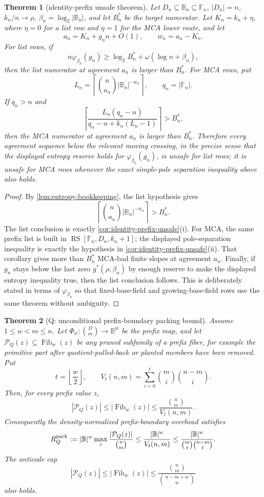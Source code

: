 \documentclass[a4paper,11pt]{amsart}
\newtheorem{theorem}{Theorem}[section]
\theoremstyle{remark}
\newcommand{\F}{\mathbb F}
\newcommand{\B}{\mathbb B}
\newcommand{\RS}{\operatorname{RS}}
\newcommand{\Fib}{\operatorname{Fib}}
\begin{document}
\begin{theorem}[identity-prefix unsafe theorem]\label{thm:unsafe-envelope}
Let \(D_n\subseteq\B_n\subseteq\F_n\), \(|D_n|=n\), \(k_n/n\to\rho\), \(\beta_n=\log_2|\B_n|\), and let \(B_n^*\) be the target numerator.  Let \(K_n=k_n+\eta\), where \(\eta=0\) for a list row and \(\eta=1\) for the MCA lower route, and let
\[
        a_n=K_n+g_nn+O(1),
        \qquad
        w_n=a_n-K_n .
\]
For list rows, if
\[
        n\varphi_{\beta_n}(g_n)
        \ge
        \log_2 B_n^*+\omega(\log n+\beta_n),
\]
then the list numerator at agreement \(a_n\) is larger than \(B_n^*\).  For MCA rows, put
\[
        L_n=\left\lceil \binom n{a_n}|\B_n|^{-w_n}\right\rceil,
        \qquad q_n=|\F_n| .
\]
If \(q_n>n\) and
\[
        \left\lceil \frac{L_n(q_n-n)}{q_n-n+k_n(L_n-1)}\right\rceil>B_n^*,
\]
then the MCA numerator at agreement \(a_n\) is larger than \(B_n^*\).  Therefore every agreement sequence below the relevant moving crossing, in the precise sense that the displayed entropy reserve holds for \(\varphi_{\beta_n}(g_n)\), is unsafe for list rows; it is unsafe for MCA rows whenever the exact simple-pole separation inequality above also holds.
\end{theorem}

\begin{proof}
By \cref{lem:entropy-bookkeeping}, the list hypothesis gives
\[
        \left\lceil\binom n{a_n}|\B_n|^{-w_n}\right\rceil>B_n^* .
\]
The list conclusion is exactly \cref{cor:identity-prefix-unsafe}(i).  For MCA, the same prefix list is built in \(\RS[\F_n,D_n,k_n+1]\); the displayed pole-separation inequality is exactly the hypothesis in \cref{cor:identity-prefix-unsafe}(ii).  That corollary gives more than \(B_n^*\) MCA-bad finite slopes at agreement \(a_n\).  Finally, if \(g_n\) stays below the last zero \(g^*(\rho,\beta_n)\) by enough reserve to make the displayed entropy inequality true, then the list conclusion follows.  This is deliberately stated in terms of \(\varphi_{\beta_n}\) so that fixed-base-field and growing-base-field rows use the same theorem without ambiguity.
\end{proof}

\begin{theorem}[Q: unconditional prefix-boundary packing bound]\label{thm:q-proper}
Assume \(1\le w<m\le n\).  Let \(\Phi_w:\binom Dm\to\B^w\) be the prefix map, and let \(\mathcal P_Q(z)\subseteq\Fib_w(z)\) be any pruned subfamily of a prefix fiber, for example the primitive part after quotient-pulled-back or planted members have been removed.  Put
\[
        t=\left\lfloor \frac{w}{2}\right\rfloor,
        \qquad
        V_t(n,m)=\sum_{i=0}^{t}\binom mi\binom{n-m}{i}.
\]
Then, for every prefix value \(z\),
\[
        |\mathcal P_Q(z)|\le |\Fib_w(z)|\le \frac{\binom nm}{V_t(n,m)}.
\]
Consequently the density-normalized prefix-boundary overhead satisfies
\[
        R_Q^{\rm pack}
        :=|\B|^w\max_z\frac{|\mathcal P_Q(z)|}{\binom nm}
        \le \frac{|\B|^w}{V_t(n,m)}
        \le \frac{|\B|^w}{\binom mt\binom{n-m}{t}}.
\]
The anticode cap
\[
        |\mathcal P_Q(z)|\le |\Fib_w(z)|\le \frac{\binom nm}{\binom{n-m+w}{w}}
\]
also holds.
\end{theorem}
\end{document}
